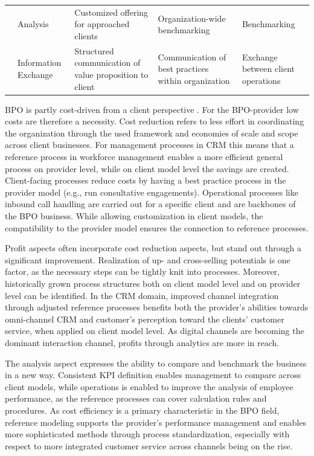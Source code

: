 \begin{table}[caption={Benefits of Reference Modelling for BPO-providers in CRM }, label=tab:refmodbpobenefits]
\begin{tabular}{p{1cm} p{2cm} |p{3cm} | p{3cm} | p{3cm} |}
		\multicolumn{1}{|l|}{}                                   & Analysis                            & Customized offering for approached clients              & Organization-wide benchmarking                     & Benchmarking                                                        \\ \cline{2-5} 
		\multicolumn{1}{|l|}{}                                   & Information Exchange                & Structured communication of value proposition to client & Communication of best practices within organization & Exchange between client operations                                  \\ \hline
	\end{tabular}
\end{table}

BPO is partly cost-driven from a client perspective \cite{Schewe2007}. For the BPO-provider low costs are therefore a necessity. Cost reduction refers to less effort in coordinating the organization through the used framework and economies of scale and scope across client businesses. For management processes in CRM this means that a reference process in workforce management enables a more efficient general process on provider level, while on client model level the savings are created. Client-facing processes reduce costs by having a best practice process in the provider model (e.g., run consultative engagements). Operational processes like inbound call handling are carried out for a specific client and are backbones of the BPO business. While allowing customization in client models, the compatibility to the provider model ensures the connection to reference processes.

Profit aspects often incorporate cost reduction aspects, but stand out through a significant improvement. Realization of up- and cross-selling potentials is one factor, as the necessary steps can be tightly knit into processes. Moreover, historically grown process structures both on client model level and on provider level can be identified. In the CRM domain, improved channel integration through adjusted reference processes benefits both the provider’s abilities towards omni-channel CRM and customer’s perception toward the clients’ customer service, when applied on client model level. As digital channels are becoming the dominant interaction channel, profits through analytics are more in reach.

The analysis aspect expresses the ability to compare and benchmark the business in a new way. Consistent KPI definition enables management to compare across client models, while operations is enabled to improve the analysis of employee performance, as the reference processes can cover calculation rules and procedures. As cost efficiency is a primary characteristic in the BPO field, reference modeling supports the provider’s performance management and enables more sophisticated methods through process standardization, especially with respect to more integrated customer service across channels being on the rise.

